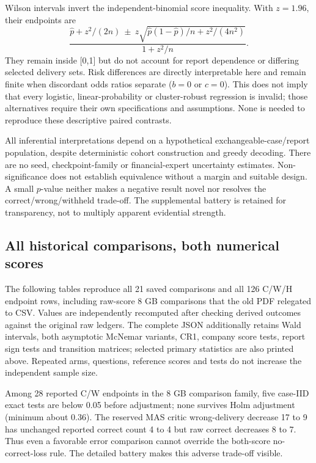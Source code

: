 Wilson intervals invert the independent-binomial score inequality. With $z=1.96$, their endpoints are
\begin{equation}
 \frac{\widehat p+z^2/(2n)\ \pm\ z\sqrt{\widehat p(1-\widehat p)/n+z^2/(4n^2)}}{1+z^2/n}.
\end{equation}
They remain inside [0,1] but do not account for report dependence or differing selected delivery sets. Risk differences are directly interpretable here and remain finite when discordant odds ratios separate ($b=0$ or $c=0$). This does not imply that every logistic, linear-probability or cluster-robust regression is invalid; those alternatives require their own specifications and assumptions. None is needed to reproduce these descriptive paired contrasts.

All inferential interpretations depend on a hypothetical exchangeable-case/report population, despite deterministic cohort construction and greedy decoding. There are no seed, checkpoint-family or financial-expert uncertainty estimates. Non-significance does not establish equivalence without a margin and suitable design. A small $p$-value neither makes a negative result novel nor resolves the correct/wrong/withheld trade-off. The supplemental battery is retained for transparency, not to multiply apparent evidential strength.

\subsection{All historical comparisons, both numerical scores}
The following tables reproduce all 21 saved comparisons and all 126 C/W/H endpoint rows, including raw-score 8 GB comparisons that the old PDF relegated to CSV. Values are independently recomputed after checking derived outcomes against the original raw ledgers. The complete JSON additionally retains Wald intervals, both asymptotic McNemar variants, CR1, company score tests, report sign tests and transition matrices; selected primary statistics are also printed above. Repeated arms, questions, reference scores and tests do not increase the independent sample size.

Among 28 reported C/W endpoints in the 8 GB comparison family, five case-IID exact tests are below 0.05 before adjustment; none survives Holm adjustment (minimum about 0.36). The reserved MAS critic wrong-delivery decrease 17 to 9 has unchanged reported correct count 4 to 4 but raw correct decreases 8 to 7. Thus even a favorable error comparison cannot override the both-score no-correct-loss rule. The detailed battery makes this adverse trade-off visible.

